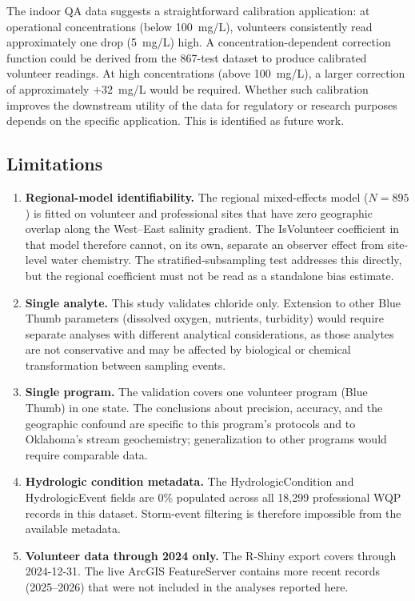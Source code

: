 \documentclass[lineno]{wlpeerj}
\begin{document}
The indoor QA data suggests a straightforward calibration application: at operational concentrations (below 100~mg/L), volunteers consistently read approximately one drop (5~mg/L) high. A concentration-dependent correction function could be derived from the 867-test dataset to produce calibrated volunteer readings. At high concentrations (above 100~mg/L), a larger correction of approximately $+32$~mg/L would be required. Whether such calibration improves the downstream utility of the data for regulatory or research purposes depends on the specific application. This is identified as future work.

\subsection{Limitations}

\begin{enumerate}
  \item \textbf{Regional-model identifiability.} The regional mixed-effects model ($N=895$) is fitted on volunteer and professional sites that have zero geographic overlap along the West--East salinity gradient. The IsVolunteer coefficient in that model therefore cannot, on its own, separate an observer effect from site-level water chemistry. The stratified-subsampling test addresses this directly, but the regional coefficient must not be read as a standalone bias estimate.
  \item \textbf{Single analyte.} This study validates chloride only. Extension to other Blue Thumb parameters (dissolved oxygen, nutrients, turbidity) would require separate analyses with different analytical considerations, as those analytes are not conservative and may be affected by biological or chemical transformation between sampling events.
  \item \textbf{Single program.} The validation covers one volunteer program (Blue Thumb) in one state. The conclusions about precision, accuracy, and the geographic confound are specific to this program's protocols and to Oklahoma's stream geochemistry; generalization to other programs would require comparable data.
  \item \textbf{Hydrologic condition metadata.} The HydrologicCondition and HydrologicEvent fields are 0\% populated across all 18,299 professional WQP records in this dataset. Storm-event filtering is therefore impossible from the available metadata.
  \item \textbf{Volunteer data through 2024 only.} The R-Shiny export covers through 2024-12-31. The live ArcGIS FeatureServer contains more recent records (2025--2026) that were not included in the analyses reported here.
\end{enumerate}
\end{document}
